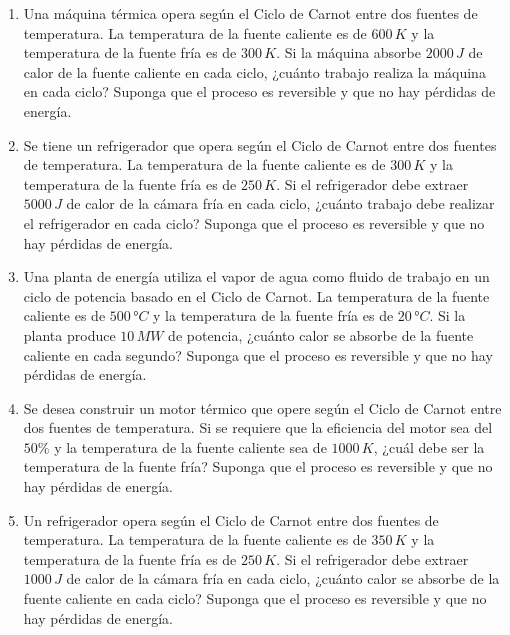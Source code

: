 \documentclass[../main]{subfiles}
\begin{document}
\begin{enumerate}
\item Una máquina térmica opera según el Ciclo de Carnot entre dos fuentes de temperatura. La temperatura de la fuente caliente es de $600\,K$ y la temperatura de la fuente fría es de $300\,K$. Si la máquina absorbe $2000\,J$ de calor de la fuente caliente en cada ciclo, ¿cuánto trabajo realiza la máquina en cada ciclo? Suponga que el proceso es reversible y que no hay pérdidas de energía.
\item Se tiene un refrigerador que opera según el Ciclo de Carnot entre dos fuentes de temperatura. La temperatura de la fuente caliente es de $300\,K$ y la temperatura de la fuente fría es de $250\,K$. Si el refrigerador debe extraer $5000\,J$ de calor de la cámara fría en cada ciclo, ¿cuánto trabajo debe realizar el refrigerador en cada ciclo? Suponga que el proceso es reversible y que no hay pérdidas de energía.
\item Una planta de energía utiliza el vapor de agua como fluido de trabajo en un ciclo de potencia basado en el Ciclo de Carnot. La temperatura de la fuente caliente es de $500\,°C$ y la temperatura de la fuente fría es de $20\,°C$. Si la planta produce $10\,MW$ de potencia, ¿cuánto calor se absorbe de la fuente caliente en cada segundo? Suponga que el proceso es reversible y que no hay pérdidas de energía.
\item Se desea construir un motor térmico que opere según el Ciclo de Carnot entre dos fuentes de temperatura. Si se requiere que la eficiencia del motor sea del $50\%$ y la temperatura de la fuente caliente sea de $1000\,K$, ¿cuál debe ser la temperatura de la fuente fría? Suponga que el proceso es reversible y que no hay pérdidas de energía.
\item Un refrigerador opera según el Ciclo de Carnot entre dos fuentes de temperatura. La temperatura de la fuente caliente es de $350\,K$ y la temperatura de la fuente fría es de $250\,K$. Si el refrigerador debe extraer $1000\,J$ de calor de la cámara fría en cada ciclo, ¿cuánto calor se absorbe de la fuente caliente en cada ciclo? Suponga que el proceso es reversible y que no hay pérdidas de energía.
\end{enumerate}
\end{document}
